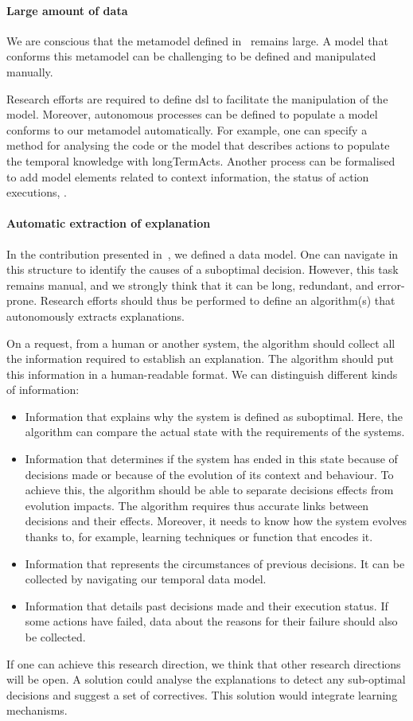 \paragraph{Large amount of data}
We are conscious that the \gls{metamodel} defined in~ remains large.
A \gls{model} that conforms this \gls{metamodel} can be challenging to be defined and manipulated manually.

Research efforts are required to define \gls{dsl} to facilitate the manipulation of the \gls{model}.
Moreover, autonomous processes can be defined to populate a \gls{model} conforms to our \gls{metamodel} automatically.
For example, one can specify a method for analysing the code or the model that describes \glspl{action} to populate the temporal knowledge with \glspl{longTermAct}.
Another process can be formalised to add \gls{model} elements related to context information, the status of action executions, \etc.

\paragraph{Automatic extraction of explanation}
In the contribution presented in~, we defined a data model.
One can navigate in this structure to identify the causes of a suboptimal decision.
However, this task remains manual, and we strongly think that it can be long, redundant, and error-prone.
Research efforts should thus be performed to define an algorithm(s) that autonomously extracts explanations.

On a request, from a human or another system, the algorithm should collect all the information required to establish an explanation.
The algorithm should put this information in a human-readable format.
We can distinguish different kinds of information:
\begin{itemize}
	\item Information that explains why the system is defined as suboptimal. Here, the algorithm can compare the actual state  with the requirements of the systems.
	\item Information that determines if the system has ended in this state because of decisions made or because of the evolution of its context and behaviour. To achieve this, the algorithm should be able to separate decisions effects from evolution impacts. The algorithm requires thus accurate links between decisions and their effects. Moreover, it needs to know how the system evolves thanks to, for example, learning techniques or function that encodes it.
	\item Information that represents the circumstances of previous decisions. It can be collected by navigating our temporal data model.
	\item Information that details past decisions made and their execution status. If some actions have failed, data about the reasons for their failure should also be collected.
\end{itemize}

If one can achieve this research direction, we think that other research directions will be open.
A solution could analyse the explanations to detect any sub-optimal decisions and suggest a set of correctives.
This solution would integrate learning mechanisms.





